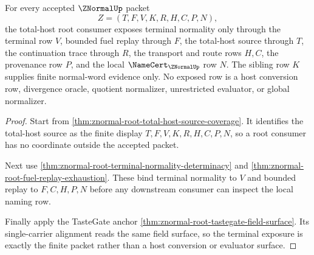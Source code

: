 \begin{theorem}
\label{thm:znormal-total-host-terminal-row-exposure}
For every accepted $\ZNormalUp$ packet
$$
Z=(T,F,V,K,R,H,C,P,N),
$$
the total-host root consumer exposes terminal normality only through the terminal row $V$, bounded fuel replay through $F$, the total-host source through $T$, the continuation trace through $R$, the transport and route rows $H,C$, the provenance row $P$, and the local $\NameCert_{\ZNormalUp}$ row $N$. The sibling row $K$ supplies finite normal-word evidence only. No exposed row is a host conversion row, divergence oracle, quotient normalizer, unrestricted evaluator, or global normalizer.
\end{theorem}
\begin{proof}
Start from \autoref{thm:znormal-root-total-host-source-coverage}. It identifies the total-host source as the finite display $T,F,V,K,R,H,C,P,N$, so a root consumer has no coordinate outside the accepted packet.

Next use \autoref{thm:znormal-root-terminal-normality-determinacy} and \autoref{thm:znormal-root-fuel-replay-exhaustion}. These bind terminal normality to $V$ and bounded replay to $F,C,H,P,N$ before any downstream consumer can inspect the local naming row.

Finally apply the TasteGate anchor \autoref{thm:znormal-root-tastegate-field-surface}. Its single-carrier alignment reads the same field surface, so the terminal exposure is exactly the finite packet rather than a host conversion or evaluator surface.
\end{proof}

